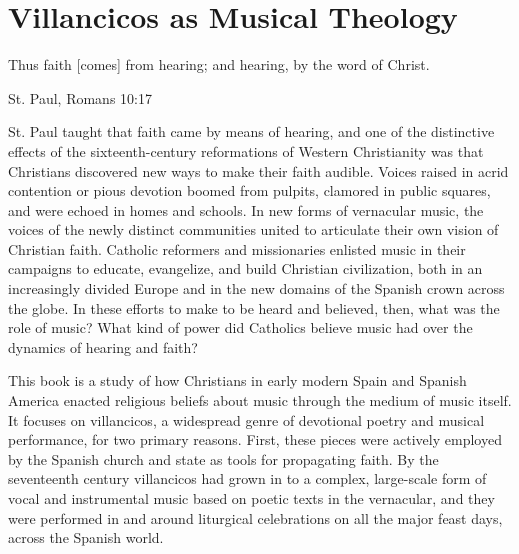 
\chapter{Villancicos as Musical Theology}

\epigraph{%
Thus faith [comes] from hearing; and hearing, by the word of Christ.%
}{St. Paul, Romans 10:17}

St. Paul taught that faith came by means of hearing, and one of the distinctive effects of the sixteenth-century reformations of Western Christianity was that Christians discovered new ways to make their faith audible.
Voices raised in acrid contention or pious devotion boomed from pulpits, clamored in public squares, and were echoed in homes and schools.
In new forms of vernacular music, the voices of the newly distinct communities united to articulate their own vision of Christian faith.
Catholic reformers and missionaries enlisted music in their campaigns to educate, evangelize, and build Christian civilization, both in an increasingly divided Europe and in the new domains of the Spanish crown across the globe. 
In these efforts to make  to be heard and believed, then, what was the role of music?
What kind of power did Catholics believe music had over the dynamics of hearing and faith?

This book is a study of how Christians in early modern Spain and Spanish America enacted religious beliefs about music through the medium of music itself.
It focuses on villancicos, a widespread genre of devotional poetry and musical performance, for two primary reasons.
First, these pieces were actively employed by the Spanish church and state as tools for propagating faith.
By the seventeenth century villancicos had grown in to a complex, large-scale form of vocal and instrumental music based on poetic texts in the vernacular, and they were performed in and around liturgical celebrations on all the major feast days, across the Spanish world.

